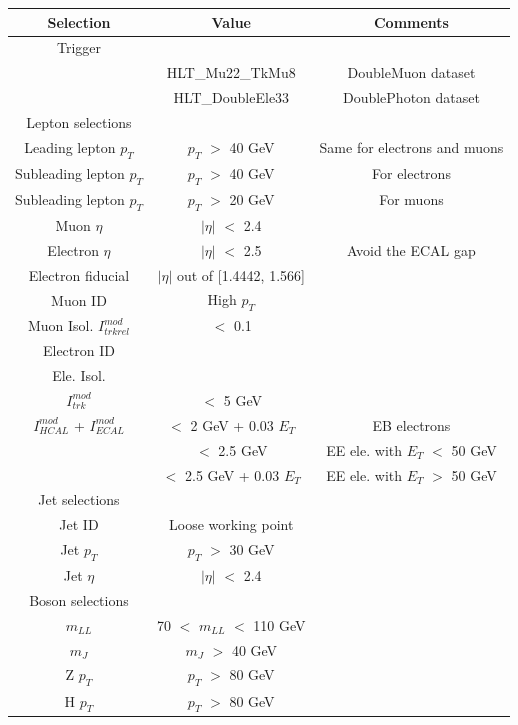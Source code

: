 \documentclass[12pt]{article} %
\begin{document}
\begin{center}
  \begin{tabular}{ c c c }
    \hline
    \bf Selection &
    \bf Value &
    \bf Comments \\
    \hline
    Trigger & & \\ \cline{1-1}
    & HLT\_Mu22\_TkMu8 & DoubleMuon dataset \\
    & HLT\_DoubleEle33 & DoublePhoton dataset \\ \hline
    Lepton selections & & \\ \cline{1-1}
    Leading lepton $p_T$ & $p_T$ $>$ 40 GeV & Same for electrons and muons \\ 
    Subleading lepton $p_T$ & $p_T$ $>$ 40 GeV & For electrons \\ 
    Subleading lepton $p_T$ & $p_T$ $>$ 20 GeV & For muons \\ 
    Muon $\eta$ & $\left|{\eta}\right|$ $<$ 2.4 &  \\
    Electron $\eta$ & $\left|{\eta}\right|$ $<$ 2.5 & Avoid the ECAL gap \\
    Electron fiducial & $\left|{\eta}\right|$ out of [1.4442, 1.566] &  \\ \cline{1-1}
    Muon ID & High $p_T$ &  \\
    Muon Isol. $I^{mod}_{trkrel}$ & $<$ 0.1 &  \\ \cline{1-1}
    Electron ID & &  \\
    Ele. Isol. & &  \\
    $I^{mod}_{trk}$ & $<$ 5 GeV &  \\
    $I^{mod}_{HCAL}$ + $I^{mod}_{ECAL}$ & $<$ 2 GeV + 0.03 $E_T$ & EB electrons \\
    & $<$ 2.5 GeV & EE ele. with $E_T$ $<$ 50 GeV \\
    & $<$ 2.5 GeV + 0.03 $E_T$ & EE ele. with $E_T$ $>$ 50 GeV \\ \hline
    Jet selections & & \\  \cline{1-1}
    Jet ID & Loose working point & \\
    Jet $p_T$ & $p_T$ $>$ 30 GeV & \\
    Jet $\eta$ & $\left|{\eta}\right|$ $<$ 2.4 & \\ \hline
    Boson selections & & \\  \cline{1-1}
    $m_{LL}$ & 70 $<$ $m_{LL}$ $<$ 110 GeV & \\
    $m_{J}$ & $m_{J}$ $>$ 40 GeV & \\
    Z $p_T$ & $p_T$ $>$ 80 GeV & \\
    H $p_T$ & $p_T$ $>$ 80 GeV & \\
    \hline
  \end{tabular}
  \label{tab:selection}
\end{center}
\end{document}
